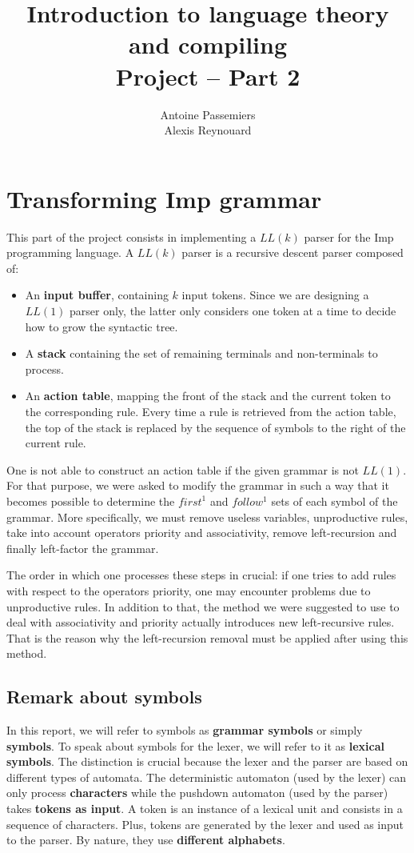 \documentclass[12pt]{report}
\title{Introduction to language theory and compiling \\ Project -- Part 2}
\author{Antoine Passemiers \\ Alexis Reynouard}
\begin{document}
\maketitle
\tableofcontents
\thispagestyle{empty}
\pagebreak
\setcounter{page}{1}
\clearpage

\chapter{Transforming Imp grammar}

This part of the project consists in implementing a $LL(k)$ parser for the Imp programming language. A $LL(k)$ parser is a recursive descent parser composed of:

\begin{itemize}
\item An \textbf{input buffer}, containing $k$ input tokens. Since we are designing a $LL(1)$ parser only, the latter only considers one token at a time to decide how to grow the syntactic tree.
\item A \textbf{stack} containing the set of remaining terminals and non-terminals to process.
\item An \textbf{action table}, mapping the front of the stack and the current token to the corresponding rule. Every time a rule is retrieved from the action table, the top of the stack is replaced by the sequence of symbols to the right of the current rule.
\end{itemize}

One is not able to construct an action table if the given grammar is not $LL(1)$. For that purpose, we were asked to modify the grammar in such a way
that it becomes possible to determine the $first^1$ and $follow^1$ sets of each symbol of the grammar. More specifically,
we must remove useless variables, unproductive rules, take into account operators priority and associativity, remove left-recursion and finally left-factor the grammar.

The order in which one processes these steps in crucial: if one tries to add rules with respect to the operators priority, one may encounter problems due
to unproductive rules. In addition to that, the method we were suggested to use to deal with associativity and priority actually introduces new left-recursive
rules. That is the reason why the left-recursion removal must be applied after using this method.

\section{Remark about symbols}
In this report, we will refer to symbols as \textbf{grammar symbols} or simply \textbf{symbols}. To speak about symbols for the lexer, we will refer to it as \textbf{lexical symbols}. The distinction is crucial because the lexer and the parser are based on different types of automata.
The deterministic automaton (used by the lexer) can only process \textbf{characters} while the pushdown automaton (used by the parser) takes
\textbf{tokens as input}. A token is an instance of a lexical unit and consists in a sequence of characters. Plus, tokens are generated by the lexer and
used as input to the parser. By nature, they use \textbf{different alphabets}.
\end{document}
